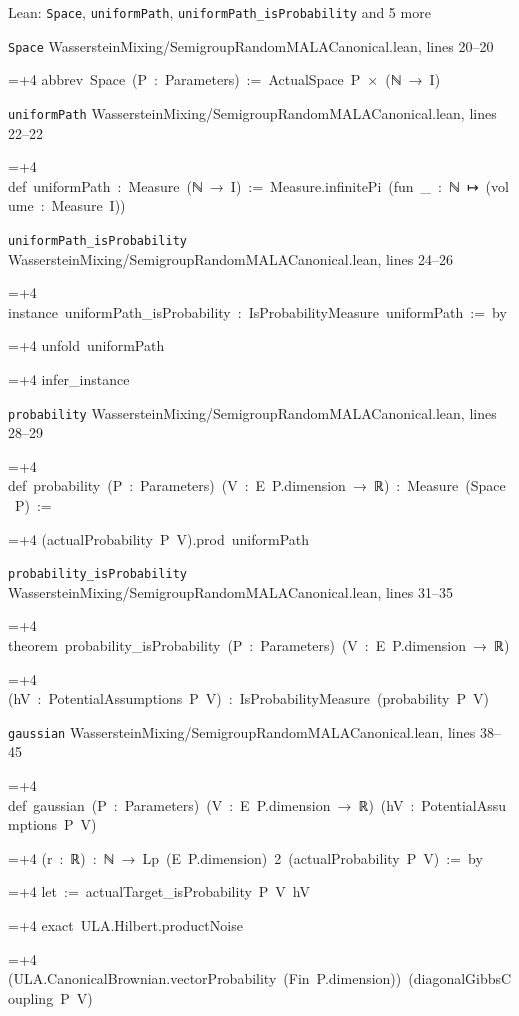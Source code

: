 \documentclass[11pt,a4paper]{article}
\newlength{\leancharwidth}
\newenvironment{leancode}{\par\smallskip\begingroup\ttfamily\footnotesize\raggedright
  \settowidth{\leancharwidth}{M}\setlength{\parskip}{0pt}\setlength{\parindent}{0pt}
  \frenchspacing}{\par\endgroup\smallskip}
\newcommand{\leanline}[2]{\hangindent=\dimexpr#1\leancharwidth+4\leancharwidth\relax
  \hangafter=1\noindent\hspace*{#1\leancharwidth}#2\par}
\newcommand{\leansource}[1]{\par{\footnotesize\color{leanmuted}#1}\par}
\begin{document}
\begin{leanbox}{Lean: \texttt{Space}, \texttt{uniformPath}, \texttt{uniformPath\_\allowbreak{}isProbability} and 5 more}
\leansource{\texttt{Space} \quad WassersteinMixing/\allowbreak{}SemigroupRandomMALACanonical.lean, lines 20–20}
\begin{leancode}
\leanline{0}{abbrev\ Space\ (P\ :\ Parameters)\ :=\ ActualSpace\ P\ ×\ (ℕ\ →\ I)}
\end{leancode}
\leansource{\texttt{uniformPath} \quad WassersteinMixing/\allowbreak{}SemigroupRandomMALACanonical.lean, lines 22–22}
\begin{leancode}
\leanline{0}{def\ uniformPath\ :\ Measure\ (ℕ\ →\ I)\ :=\ Measure.infinitePi\ (fun\ \_\ :\ ℕ\ ↦\ (volume\ :\ Measure\ I))}
\end{leancode}
\leansource{\texttt{uniformPath\_\allowbreak{}isProbability} \quad WassersteinMixing/\allowbreak{}SemigroupRandomMALACanonical.lean, lines 24–26}
\begin{leancode}
\leanline{0}{instance\ uniformPath\_isProbability\ :\ IsProbabilityMeasure\ uniformPath\ :=\ by}
\leanline{2}{unfold\ uniformPath}
\leanline{2}{infer\_instance}
\end{leancode}
\leansource{\texttt{probability} \quad WassersteinMixing/\allowbreak{}SemigroupRandomMALACanonical.lean, lines 28–29}
\begin{leancode}
\leanline{0}{def\ probability\ (P\ :\ Parameters)\ (V\ :\ E\ P.dimension\ →\ ℝ)\ :\ Measure\ (Space\ P)\ :=}
\leanline{2}{(actualProbability\ P\ V).prod\ uniformPath}
\end{leancode}
\leansource{\texttt{probability\_\allowbreak{}isProbability} \quad WassersteinMixing/\allowbreak{}SemigroupRandomMALACanonical.lean, lines 31–35}
\begin{leancode}
\leanline{0}{theorem\ probability\_isProbability\ (P\ :\ Parameters)\ (V\ :\ E\ P.dimension\ →\ ℝ)}
\leanline{4}{(hV\ :\ PotentialAssumptions\ P\ V)\ :\ IsProbabilityMeasure\ (probability\ P\ V)}
\end{leancode}
\leansource{\texttt{gaussian} \quad WassersteinMixing/\allowbreak{}SemigroupRandomMALACanonical.lean, lines 38–45}
\begin{leancode}
\leanline{0}{def\ gaussian\ (P\ :\ Parameters)\ (V\ :\ E\ P.dimension\ →\ ℝ)\ (hV\ :\ PotentialAssumptions\ P\ V)}
\leanline{4}{(r\ :\ ℝ)\ :\ ℕ\ →\ Lp\ (E\ P.dimension)\ 2\ (actualProbability\ P\ V)\ :=\ by}
\leanline{2}{let\ :=\ actualTarget\_isProbability\ P\ V\ hV}
\leanline{2}{exact\ ULA.Hilbert.productNoise}
\leanline{4}{(ULA.CanonicalBrownian.vectorProbability\ (Fin\ P.dimension))\ (diagonalGibbsCoupling\ P\ V)}

\end{leancode}
\end{leanbox}
\end{document}

